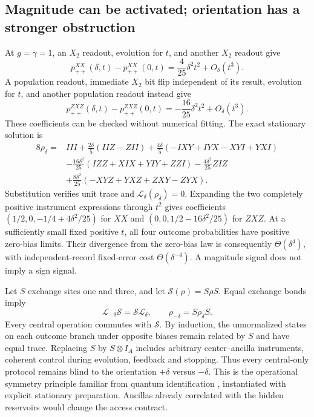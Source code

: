 \subsection{Magnitude can be activated; orientation has a stronger obstruction}

At $g=\gamma=1$, an $X_2$ readout, evolution for $t$, and another $X_2$ readout
give
\begin{equation}
 p_{++}^{XX}(\delta,t)-p_{++}^{XX}(0,t)
     =\frac4{25}\delta^2t^2+O_\delta(t^3).
 \label{eq:applications-xx-mag}
\end{equation}
A population readout, immediate $X_2$ bit flip independent of its result,
evolution for $t$, and another population readout instead give
\begin{equation}
 p_{++}^{ZXZ}(\delta,t)-p_{++}^{ZXZ}(0,t)
     =-\frac{16}{25}\delta^2t^2+O_\delta(t^3).
\end{equation}
These coefficients can be checked without numerical fitting. The exact
stationary solution is
\begin{align}
 8\rho_\delta={}&III+\tfrac{2\delta}{5}(IIZ-ZII)
 +\tfrac{4\delta}{5}(-IXY+IYX-XYI+YXI)\nonumber\\
 &-\tfrac{16\delta^2}{25}(IZZ+XIX+YIY+ZZI)
   -\tfrac{4\delta^2}{25}ZIZ\nonumber\\
 &+\tfrac{8\delta^2}{25}(-XYZ+YXZ+ZXY-ZYX).
 \label{eq:applications-xx-state}
\end{align}
Substitution verifies unit trace and $\mathcal L_\delta(\rho_\delta)=0$.
Expanding the two completely positive instrument expressions through
$t^2$ gives coefficients $(1/2,0,-1/4+4\delta^2/25)$ for $XX$ and
$(0,0,1/2-16\delta^2/25)$ for $ZXZ$. At a sufficiently small fixed positive
$t$, all four outcome probabilities have positive zero-bias limits.
Their divergence from the zero-bias law is consequently
$\Theta(\delta^4)$, with independent-record fixed-error cost
$\Theta(\delta^{-4})$. A magnitude signal does not imply a sign signal.

Let $S$ exchange sites one and three, and let
$\mathcal S(\rho)=S\rho S$. Equal exchange bonds imply
\begin{equation}
 \mathcal L_{-\delta}\mathcal S=\mathcal S\mathcal L_\delta,
 \qquad \rho_{-\delta}=S\rho_\delta S.
 \label{eq:applications-xx-symmetry}
\end{equation}
Every central operation commutes with $\mathcal S$. By induction, the
unnormalized states on each outcome branch under opposite biases remain
related by $S$ and have equal trace. Replacing $S$ by $S\otimes I_A$ includes
arbitrary center--ancilla instruments, coherent control during evolution,
feedback and stopping. Thus every central-only protocol remains blind to
the orientation $+\delta$ versus $-\delta$. This is the operational symmetry
principle familiar from quantum identification
\cite{physics-burgarth,physics-guta}, instantiated with explicit stationary
preparation. Ancillas already correlated with the hidden reservoirs would
change the access contract.

